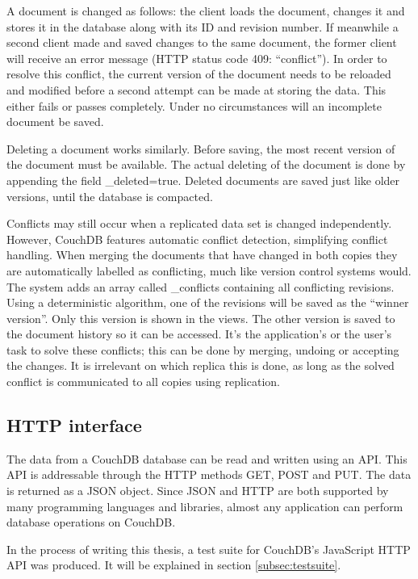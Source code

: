A document is changed as follows: the client loads the document, changes it and stores it in the database along with its ID and revision number. If meanwhile a second client made and saved changes to the same document, the former client will receive an error message (HTTP status code 409: \enquote{conflict}). In order to resolve this conflict, the current version of the document needs to be reloaded and modified before a second attempt can be made at storing the data. This either fails or passes completely. Under no circumstances will an incomplete document be saved.

Deleting a document works similarly. Before saving, the most recent version of the document must be available. The actual deleting of the document is done by appending the field {\selectfont \_deleted=true}. Deleted documents are saved just like older versions, until the database is compacted.

Conflicts may still occur when a replicated data set is changed independently. However, CouchDB features automatic conflict detection, simplifying conflict handling. When merging the documents that have changed in both copies they are automatically labelled as conflicting, much like version control systems would. The system adds an array called {\selectfont \_conflicts} containing all conflicting revisions. Using a deterministic algorithm, one of the revisions will be saved as the \enquote{winner version}. Only this version is shown in the views. The other version is saved to the document history so it can be accessed. It's the application's or the user's task to solve these conflicts; this can be done by merging, undoing or accepting the changes. It is irrelevant on which replica this is done, as long as the solved conflict is communicated to all copies using replication.



\subsection{HTTP interface}
\label{subsec:api}

The data from a CouchDB database can be read and written using an API. This API is addressable through the HTTP methods GET, POST and PUT. The data is returned as a JSON object. Since JSON and HTTP are both supported by many programming languages and libraries, almost any application can perform database operations on CouchDB.

In the process of writing this thesis, a test suite for CouchDB's JavaScript HTTP API was produced. It will be explained in section \ref{subsec:testsuite}.

